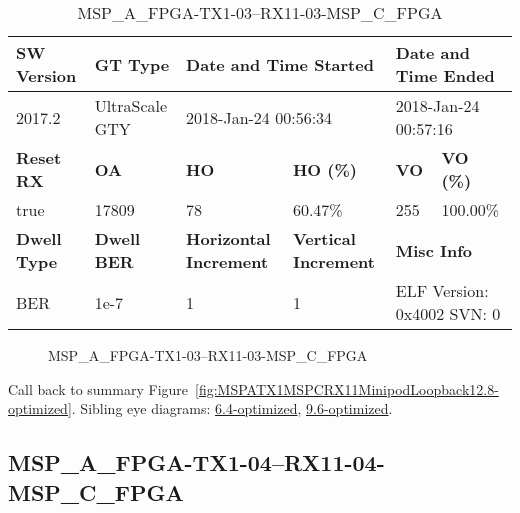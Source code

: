 \begin{table}[h]
\centering
\caption{MSP\_A\_FPGA-TX1-03--RX11-03-MSP\_C\_FPGA}
\label{tab:MSPAFPGATX103RX1103MSPCFPGA12.8-optimized}
\begin{tabular}{@{}|l|l|l|l|l|l|@{}}
\toprule
\textbf{SW Version}                & \textbf{GT Type}   & \multicolumn{2}{l|}{\textbf{Date and Time Started}}            & \multicolumn{2}{l|}{\textbf{Date and Time Ended}}        \\ \midrule
2017.2                       & UltraScale GTY          & \multicolumn{2}{l|}{2018-Jan-24 00:56:34}                   & \multicolumn{2}{l|}{2018-Jan-24 00:57:16}               \\ \midrule
\textbf{Reset RX}                  & \textbf{OA} & \textbf{HO}   & \textbf{HO (\%)} & \textbf{VO} & \textbf{VO (\%)} \\ \midrule
true & 17809        & 78          & 60.47\%        & 255        & 100.00\%       \\ \midrule
\textbf{Dwell Type}                & \textbf{Dwell BER} & \textbf{Horizontal Increment} & \textbf{Vertical Increment}    & \multicolumn{2}{l|}{\textbf{Misc Info}}                  \\ \midrule
BER                            & 1e-7        & 1        & 1           & \multicolumn{2}{l|}{ELF Version: 0x4002 SVN: 0}                         \\ \bottomrule
\end{tabular}
\end{table}

\begin{figure}[h]
\caption{MSP\_A\_FPGA-TX1-03--RX11-03-MSP\_C\_FPGA} \label{fig:MSPAFPGATX103RX1103MSPCFPGA12.8-optimized}
\end{figure}

Call back to summary Figure~\ref{fig:MSPATX1MSPCRX11MinipodLoopback12.8-optimized}.
Sibling eye diagrams: \hyperref[sec:MSPAFPGATX103RX1103MSPCFPGA6.4-optimized]{6.4-optimized}, \hyperref[sec:MSPAFPGATX103RX1103MSPCFPGA9.6-optimized]{9.6-optimized}.

\clearpage
\newpage


\subsection{MSP\_A\_FPGA-TX1-04--RX11-04-MSP\_C\_FPGA}\label{sec:MSPAFPGATX104RX1104MSPCFPGA12.8-optimized}

